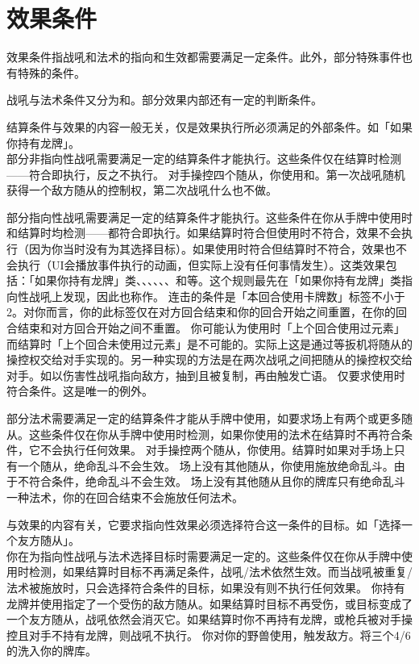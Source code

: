 \section{效果条件}
\label{effect-cond}

效果条件指战吼和法术的指向和生效都需要满足一定条件。此外，部分特殊事件也有特殊的条件。

战吼与法术条件又分为和。部分效果内部还有一定的判断条件。

结算条件与效果的内容一般无关，仅是效果执行所必须满足的外部条件。如「如果你持有龙牌」。\\
部分非指向性战吼需要满足一定的结算条件才能执行。这些条件仅在结算时检测——符合即执行，反之不执行。
\example 对手操控四个随从，你使用和。第一次战吼随机获得一个敌方随从的控制权，第二次战吼什么也不做。

部分指向性战吼需要满足一定的结算条件才能执行。这些条件在你从手牌中使用时和结算时均检测——都符合即执行。如果结算时符合但使用时不符合，效果不会执行（因为你当时没有为其选择目标）。如果使用时符合但结算时不符合，效果也不会执行（UI会播放事件执行的动画，但实际上没有任何事情发生）。这类效果包括：「如果你持有龙牌」类、、、、、、和等。这个规则最先在「如果你持有龙牌」类指向性战吼上发现，因此也称作。
\notice 连击的条件是「本回合使用卡牌数」标签不小于2。对你而言，你的此标签仅在对方回合结束和你的回合开始之间重置，在你的回合结束和对方回合开始之间不重置。
\notice 你可能认为使用时「上个回合使用过元素」而结算时「上个回合未使用过元素」是不可能的。实际上这是通过等扳机将随从的操控权交给对手实现的。另一种实现的方法是在两次战吼之间把随从的操控权交给对手。如以伤害性战吼指向敌方，抽到且被复制，再由触发亡语。
\exception {}仅要求使用时符合条件。这是唯一的例外。

部分法术需要满足一定的结算条件才能从手牌中使用，如要求场上有两个或更多随从。这些条件仅在你从手牌中使用时检测，如果你使用的法术在结算时不再符合条件，它不会执行任何效果。
\example 对手操控两个随从，你使用。结算时如果对手场上只有一个随从，绝命乱斗不会生效。
\example 场上没有其他随从，你使用施放绝命乱斗。由于不符合条件，绝命乱斗不会生效。
\example 场上没有其他随从且你的牌库只有绝命乱斗一种法术，你的在回合结束不会施放任何法术。

与效果的内容有关，它要求指向性效果必须选择符合这一条件的目标。如「选择一个友方随从」。\\
你在为指向性战吼与法术选择目标时需要满足一定的。这些条件仅在你从手牌中使用时检测，如果结算时目标不再满足条件，战吼/法术依然生效。而当战吼被重复/法术被施放时，只会选择符合条件的目标，如果没有则不执行任何效果。
\example 你持有龙牌并使用指定了一个受伤的敌方随从。如果结算时目标不再受伤，或目标变成了一个友方随从，战吼依然会消灭它。如果结算时你不再持有龙牌，或枪兵被对手操控且对手不持有龙牌，则战吼不执行。
\example 你对你的野兽使用，触发敌方。将三个4/6的洗入你的牌库。

